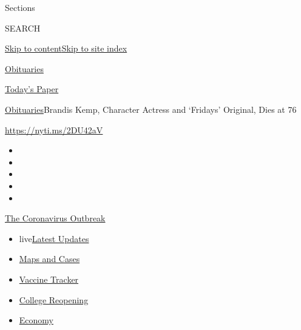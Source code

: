 Sections

SEARCH

\protect\hyperlink{site-content}{Skip to
content}\protect\hyperlink{site-index}{Skip to site index}

\href{https://www.nytimes3xbfgragh.onion/section/obituaries}{Obituaries}

\href{https://myaccount.nytimes3xbfgragh.onion/auth/login?response_type=cookie\&client_id=vi}{}

\href{https://www.nytimes3xbfgragh.onion/section/todayspaper}{Today's
Paper}

\href{/section/obituaries}{Obituaries}\textbar{}Brandis Kemp, Character
Actress and `Fridays' Original, Dies at 76

\url{https://nyti.ms/2DU42aV}

\begin{itemize}
\item
\item
\item
\item
\item
\end{itemize}

\href{https://www.nytimes3xbfgragh.onion/news-event/coronavirus?action=click\&pgtype=Article\&state=default\&region=TOP_BANNER\&context=storylines_menu}{The
Coronavirus Outbreak}

\begin{itemize}
\tightlist
\item
  live\href{https://www.nytimes3xbfgragh.onion/2020/08/04/world/coronavirus-covid-19.html?action=click\&pgtype=Article\&state=default\&region=TOP_BANNER\&context=storylines_menu}{Latest
  Updates}
\item
  \href{https://www.nytimes3xbfgragh.onion/interactive/2020/us/coronavirus-us-cases.html?action=click\&pgtype=Article\&state=default\&region=TOP_BANNER\&context=storylines_menu}{Maps
  and Cases}
\item
  \href{https://www.nytimes3xbfgragh.onion/interactive/2020/science/coronavirus-vaccine-tracker.html?action=click\&pgtype=Article\&state=default\&region=TOP_BANNER\&context=storylines_menu}{Vaccine
  Tracker}
\item
  \href{https://www.nytimes3xbfgragh.onion/2020/08/02/us/covid-college-reopening.html?action=click\&pgtype=Article\&state=default\&region=TOP_BANNER\&context=storylines_menu}{College
  Reopening}
\item
  \href{https://www.nytimes3xbfgragh.onion/live/2020/08/03/business/stock-market-today-coronavirus?action=click\&pgtype=Article\&state=default\&region=TOP_BANNER\&context=storylines_menu}{Economy}
\end{itemize}


